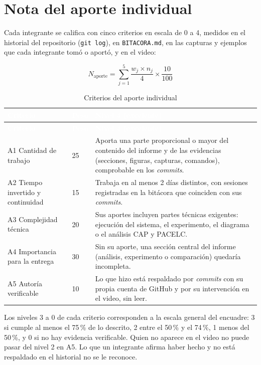 \documentclass[11pt,a4paper]{article}
\newcommand{\hdr}[1]{\textcolor{white}{\textbf{#1}}}
\begin{document}
\section{Nota del aporte individual}\label{sec:aporte}

Cada integrante se califica con cinco criterios en escala de 0 a 4, medidos en el historial del repositorio (\texttt{git log}), en \texttt{BITACORA.md}, en las capturas y ejemplos que cada integrante tomó o aportó, y en el video:

\[ N_{\text{aporte}} = \sum_{j=1}^{5} \frac{w_j \times n_j}{4} \times \frac{10}{100} \]

\begin{xltabular}{\linewidth}{@{}L{3.6cm}C{1.0cm}Y@{}}
	\caption{Criterios del aporte individual}\label{tab:aporte}\\
	\toprule
	\hdr{Criterio} & \hdr{Peso} & \hdr{Nivel 4 (excelente)} \\
	\midrule
	\endfirsthead
	\toprule
	\hdr{Criterio} & \hdr{Peso} & \hdr{Nivel 4 (excelente)} \\
	\midrule
	\endhead
	A1 Cantidad de trabajo & 25 & Aporta una parte proporcional o mayor del contenido del informe y de las evidencias (secciones, figuras, capturas, comandos), comprobable en los \emph{commits}. \\
	\addlinespace
	A2 Tiempo invertido y continuidad & 15 & Trabaja en al menos 2 días distintos, con sesiones registradas en la bitácora que coinciden con sus \emph{commits}. \\
	\addlinespace
	A3 Complejidad técnica & 20 & Sus aportes incluyen partes técnicas exigentes: ejecución del sistema, el experimento, el diagrama o el análisis CAP y PACELC. \\
	\addlinespace
	A4 Importancia para la entrega & 30 & Sin su aporte, una sección central del informe (análisis, experimento o comparación) quedaría incompleta. \\
	\addlinespace
	A5 Autoría verificable & 10 & Lo que hizo está respaldado por \emph{commits} con su propia cuenta de GitHub y por su intervención en el video, sin leer. \\
	\bottomrule
\end{xltabular}

Los niveles 3 a 0 de cada criterio corresponden a la escala general del encuadre: 3 si cumple al menos el 75\,\% de lo descrito, 2 entre el 50\,\% y el 74\,\%, 1 menos del 50\,\%, y 0 si no hay evidencia verificable. Quien no aparece en el video no puede pasar del nivel 2 en A5. Lo que un integrante afirma haber hecho y no está respaldado en el historial no se le reconoce.
\end{document}
